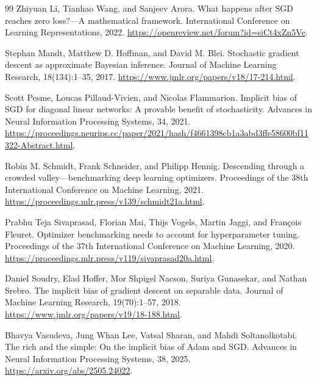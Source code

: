 \documentclass[11pt,twoside]{article}
\theoremstyle{definition}
\theoremstyle{remark}
\begin{document}
\begin{thebibliography}{99}
Zhiyuan Li, Tianhao Wang, and Sanjeev Arora.
\newblock What happens after SGD reaches zero loss?---A mathematical
framework.
\newblock International Conference on Learning Representations, 2022.
\newblock \url{https://openreview.net/forum?id=siCt4xZn5Ve}.

Stephan Mandt, Matthew D. Hoffman, and David M. Blei.
\newblock Stochastic gradient descent as approximate Bayesian inference.
\newblock Journal of Machine Learning Research, 18(134):1--35, 2017.
\newblock \url{https://www.jmlr.org/papers/v18/17-214.html}.

Scott Pesme, Loucas Pillaud-Vivien, and Nicolas Flammarion.
\newblock Implicit bias of SGD for diagonal linear networks: A provable
benefit of stochasticity.
\newblock Advances in Neural Information Processing Systems, 34, 2021.
\newblock \url{https://proceedings.neurips.cc/paper/2021/hash/f4661398cb1a3abd3ffe58600bf11322-Abstract.html}.

Robin M. Schmidt, Frank Schneider, and Philipp Hennig.
\newblock Descending through a crowded valley---benchmarking deep learning
optimizers.
\newblock Proceedings of the 38th International Conference on Machine
Learning, 2021.
\newblock \url{https://proceedings.mlr.press/v139/schmidt21a.html}.

Prabhu Teja Sivaprasad, Florian Mai, Thijs Vogels, Martin Jaggi, and
Fran\c{c}ois Fleuret.
\newblock Optimizer benchmarking needs to account for hyperparameter tuning.
\newblock Proceedings of the 37th International Conference on Machine
Learning, 2020.
\newblock \url{https://proceedings.mlr.press/v119/sivaprasad20a.html}.

Daniel Soudry, Elad Hoffer, Mor Shpigel Nacson, Suriya Gunasekar, and
Nathan Srebro.
\newblock The implicit bias of gradient descent on separable data.
\newblock Journal of Machine Learning Research, 19(70):1--57, 2018.
\newblock \url{https://www.jmlr.org/papers/v19/18-188.html}.

Bhavya Vasudeva, Jung Whan Lee, Vatsal Sharan, and Mahdi Soltanolkotabi.
\newblock The rich and the simple: On the implicit bias of Adam and SGD.
\newblock Advances in Neural Information Processing Systems, 38, 2025.
\newblock \url{https://arxiv.org/abs/2505.24022}.


\end{thebibliography}
\end{document}
